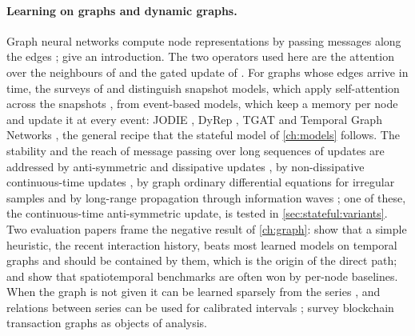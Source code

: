 \paragraph{Learning on graphs and dynamic graphs.}  Graph neural networks compute node
representations by passing messages along the edges \cite{scarselli2009gnn,micheli2009nn4g,
kipf2017gcn,hamilton2017graphsage,gilmer2017mpnn}; \textcite{bacciu2020gentle} give an
introduction.  The two operators used here are the attention over the neighbours of
\textcite{velickovic2018gat} and the gated update of \textcite{li2016ggnn}.  For graphs whose
edges arrive in time, the surveys of \textcite{kazemi2020survey} and
\textcite{gravina2024dynamic} distinguish snapshot models, which apply self-attention across
the snapshots \cite{sankar2019dysat,jiang2026evolving}, from event-based models, which keep
a memory per node and update it at every event: JODIE \cite{kumar2019jodie}, DyRep
\cite{trivedi2019dyrep}, TGAT \cite{xu2020tgat} and Temporal Graph Networks
\cite{rossi2020tgn}, the general recipe that the stateful model of \cref{ch:models} follows.
The stability and the reach of message passing over long sequences of updates are addressed
by anti-symmetric and dissipative updates \cite{gravina2023antisymmetric,ceni2025mpssm},
by non-dissipative continuous-time updates \cite{gravina2024ctan}, by graph ordinary
differential equations for irregular samples \cite{gravina2024tgode} and by long-range
propagation through information waves \cite{trenta2025sonar}; one of these, the
continuous-time anti-symmetric update, is tested in \cref{sec:stateful:variants}.  Two
evaluation papers frame the negative result of \cref{ch:graph}: \textcite{feldman2026navis}
show that a simple heuristic, the recent interaction history, beats most learned models on
temporal graphs and should be contained by them, which is the origin of the direct path; and
\textcite{martin2026audit} show that spatiotemporal benchmarks are often won by per-node
baselines.  When the graph is not given it can be learned sparsely from the series
\cite{cini2023sparse}, and relations between series can be used for calibrated intervals
\cite{cini2025relational}; \textcite{akcora2022blockchain} survey blockchain transaction
graphs as objects of analysis.

